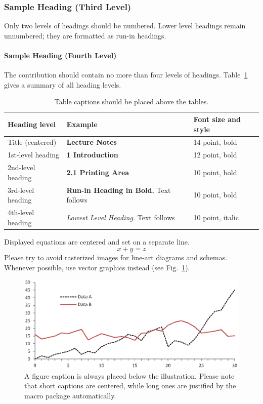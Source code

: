 \documentclass[runningheads]{llncs}
\begin{document}
\subsubsection{Sample Heading (Third Level)} Only two levels of
headings should be numbered. Lower level headings remain unnumbered;
they are formatted as run-in headings.

\paragraph{Sample Heading (Fourth Level)}
The contribution should contain no more than four levels of
headings. Table~\ref{tab1} gives a summary of all heading levels.

\begin{table}
\caption{Table captions should be placed above the
tables.}\label{tab1}
\begin{tabular}{|l|l|l|}
\hline
Heading level &  Example & Font size and style\\
\hline
Title (centered) &  {\Large\bfseries Lecture Notes} & 14 point, bold\\
1st-level heading &  {\large\bfseries 1 Introduction} & 12 point, bold\\
2nd-level heading & {\bfseries 2.1 Printing Area} & 10 point, bold\\
3rd-level heading & {\bfseries Run-in Heading in Bold.} Text follows & 10 point, bold\\
4th-level heading & {\itshape Lowest Level Heading.} Text follows & 10 point, italic\\
\hline
\end{tabular}
\end{table}


\noindent Displayed equations are centered and set on a separate
line.
\begin{equation}
x + y = z
\end{equation}
Please try to avoid rasterized images for line-art diagrams and
schemas. Whenever possible, use vector graphics instead (see
Fig.~\ref{fig1}).

\begin{figure}
\includegraphics[width=\textwidth]{fig1.eps}
\caption{A figure caption is always placed below the illustration.
Please note that short captions are centered, while long ones are
justified by the macro package automatically.} \label{fig1}
\end{figure}
\end{document}

